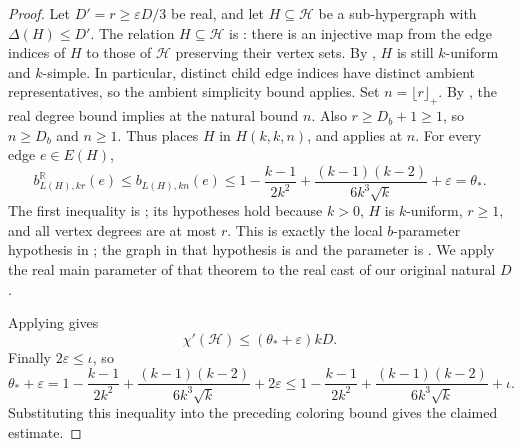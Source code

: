 \begin{proof}
Let $D'=r\ge \varepsilon D/3$ be real, and let
$H\subseteq\mathcal H$ be a sub-hypergraph with
$\Delta(H)\le D'$.  The relation $H\subseteq\mathcal H$ is
: there is an injective map from the edge indices
of $H$ to those of $\mathcal H$ preserving their vertex sets.
By , $H$ is still $k$-uniform and
$k$-simple. In particular, distinct child edge indices have distinct
ambient representatives, so the ambient simplicity bound applies.
Set $n=\lfloor r\rfloor_+$. By , the real
degree bound implies  at the natural bound $n$.
Also $r\ge D_b+1\ge1$, so $n\ge D_b$ and $n\ge1$.
Thus  places $H$ in $H(k,k,n)$, and
 applies at $n$.
For every edge
$e\in E(H)$,
\[
b^{\mathbb R}_{L(H),kr}(e)
\le b_{L(H),kn}(e)
\le
1-\frac{k-1}{2k^2}
+\frac{(k-1)(k-2)}{6k^3\sqrt{k}}+\varepsilon
=\theta_* .
\]
The first inequality is ;
its hypotheses hold because $k>0$, $H$ is $k$-uniform, $r\ge1$, and
all vertex degrees are at most $r$.
This is exactly the local $b$-parameter hypothesis in
; the graph in that hypothesis is
 and the parameter is
. We apply the real main parameter of that
theorem to the real cast of our original natural $D$.

Applying  gives
\[
\chi'(\mathcal H)\le(\theta_*+\varepsilon)kD.
\]
Finally $2\varepsilon\le\iota$, so
\[
\theta_*+\varepsilon
=
1-\frac{k-1}{2k^2}
+\frac{(k-1)(k-2)}{6k^3\sqrt{k}}+2\varepsilon
\le
1-\frac{k-1}{2k^2}
+\frac{(k-1)(k-2)}{6k^3\sqrt{k}}+\iota.
\]
Substituting this inequality into the preceding coloring bound gives the
claimed estimate.
\end{proof}
